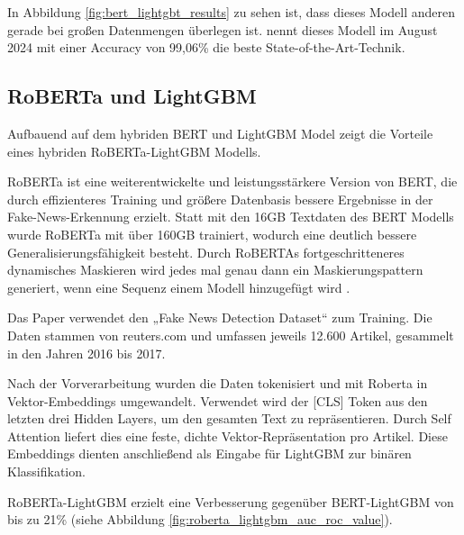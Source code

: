 In Abbildung \ref{fig:bert_lightgbt_results} zu sehen ist, dass dieses Modell anderen gerade bei großen Datenmengen überlegen ist.
\cite{Dhiman:2024aa} nennt dieses Modell im August 2024 mit einer Accuracy von 99,06\% die beste State-of-the-Art-Technik.


\subsection{RoBERTa und LightGBM}
\label{sec:roberta_lightgbm}

Aufbauend auf dem hybriden BERT und LightGBM Model zeigt \cite{V_G_2024} die Vorteile eines hybriden RoBERTa-LightGBM Modells.

RoBERTa ist eine weiterentwickelte und leistungsstärkere Version von BERT, die durch effizienteres Training und größere Datenbasis 
bessere Ergebnisse in der Fake-News-Erkennung erzielt. 
Statt mit den 16GB Textdaten des BERT Modells wurde RoBERTa mit über 160GB trainiert, wodurch eine deutlich bessere Generalisierungsfähigkeit besteht.
Durch RoBERTAs fortgeschritteneres dynamisches Maskieren wird jedes mal genau dann ein Maskierungspattern generiert, wenn eine Sequenz einem Modell hinzugefügt wird \cite{roberta:main}.

Das Paper verwendet den „Fake News Detection Dataset“ zum Training. 
Die Daten stammen von reuters.com und umfassen jeweils 12.600 Artikel, gesammelt in den Jahren 2016 bis 2017.

Nach der Vorverarbeitung wurden die Daten tokenisiert und mit Roberta in Vektor-Embeddings umgewandelt.
Verwendet wird der [CLS] Token aus den letzten drei Hidden Layers, um den gesamten Text zu repräsentieren.
Durch Self Attention liefert dies eine feste, dichte Vektor-Repräsentation pro Artikel.
Diese Embeddings dienten anschließend als Eingabe für LightGBM zur binären Klassifikation.

RoBERTa-LightGBM erzielt eine Verbesserung gegenüber BERT-LightGBM von bis zu 21\% (siehe Abbildung \ref{fig:roberta_lightgbm_auc_roc_value}).

